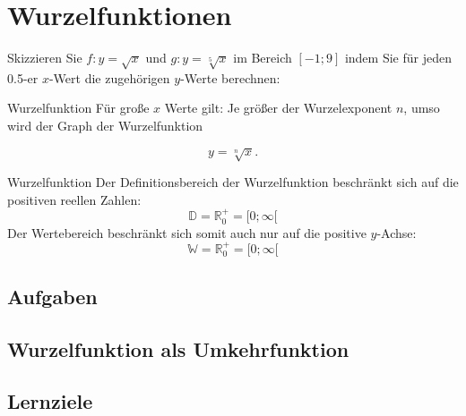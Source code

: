 \section{Wurzelfunktionen}




Skizzieren Sie $f: y = \sqrt{x}$ und $g: y=\sqrt[5]{x}$ im Bereich $[-1; 9]$ indem Sie für jeden 0.5-er $x$-Wert die zugehörigen $y$-Werte berechnen:


\begin{bemerkung}{Wurzelfunktion}{}
Für große $x$ Werte gilt: Je größer der Wurzelexponent $n$, umso
 wird der Graph der Wurzelfunktion

$$y=\sqrt[n]{x}.$$ 

\end{bemerkung}


\begin{definition}{Wurzelfunktion}{}
  Der Definitionsbereich der Wurzelfunktion beschränkt sich auf die
  positiven reellen Zahlen:
  $$\mathbb{D} = \mathbb{R}_0^{+} = [0;\infty[$$
      Der Wertebereich beschränkt sich somit auch nur auf die positive $y$-Achse:
  $$\mathbb{W} = \mathbb{R}_0^{+} = [0;\infty[$$
      
\end{definition}
\newpage

\subsection*{Aufgaben}



\newpage

\subsection{Wurzelfunktion als
  Umkehrfunktion}

\subsection*{Lernziele}

